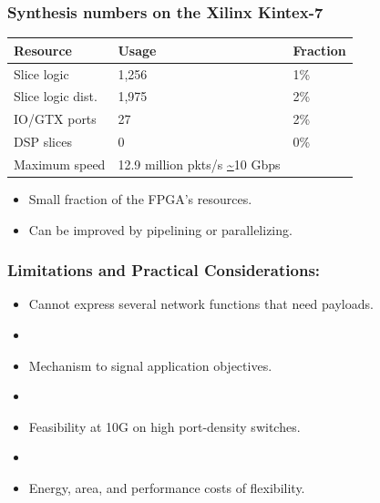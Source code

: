\begin{Large}
\begin{frame}[plain]
\frametitle{Synthesis numbers on the Xilinx Kintex-7}
\begin{center}
\begin{tabular}{p{} p{} p{}}
\bf Resource & \bf Usage & \bf Fraction \\
\hline Slice logic & 1,256 & 1\% \\
Slice logic dist. & 1,975 & 2\% \\
IO/GTX ports & 27 & 2\% \\
DSP slices & 0 & 0\% \\
Maximum speed & 12.9 million pkts/s \url{~}10 Gbps \\
\end{tabular}
\end{center}
\begin{itemize}
\item Small fraction of the FPGA's resources.
\item Can be improved by pipelining or parallelizing.
\end{itemize}
\end{frame}

\begin{frame}[plain]
\frametitle{Limitations and Practical Considerations:}
\begin{itemize}
\item Cannot express several network functions that need payloads.
\item[]
\item Mechanism to signal application objectives.
\item[]
\item Feasibility at 10G on high port-density  switches.
\item[]
\item Energy, area, and performance costs of flexibility.
\end{itemize}
\end{frame}



\end{Large}
